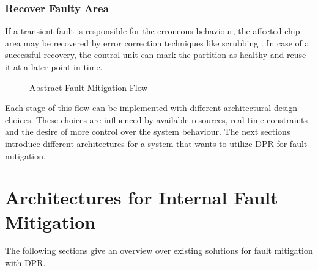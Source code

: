 \subsubsection{Recover Faulty Area}
    If a transient fault is responsible for the erroneous behaviour, the affected chip area may be recovered by error correction techniques like scrubbing \cite{reorda_error-detection_2017}. 
    In case of a successful recovery, the control-unit can mark the partition as healthy and reuse it at a later point in time.
\begin{center}
\begin{figure}[h]
    \centering
    \resizebox{\smallColumnWidth}{!} {
        
    }
\caption{Abstract Fault Mitigation Flow}
\label{fig:internalFaultFlow}
\end{figure}
\end{center}
Each stage of this flow can be implemented with different architectural design choices.
These choices are influenced by available resources, real-time constraints and the desire of more control over the system behaviour.
The next sections introduce different architectures for a system that wants to utilize \gls{DPR} for fault mitigation.

\section{Architectures for Internal Fault Mitigation}\label{InternalFaultsArch}
The following sections give an overview over existing solutions for fault mitigation with \gls{DPR}. 

